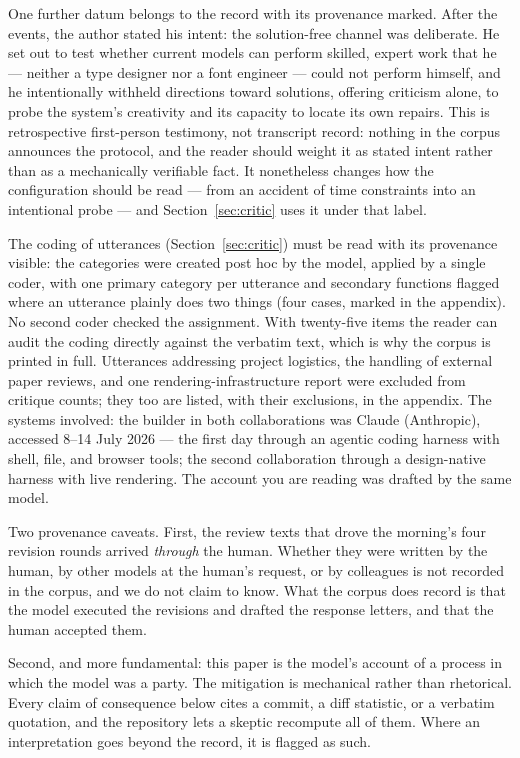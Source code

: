 \documentclass[11pt]{article}
\begin{document}
One further datum belongs to the record with its provenance marked. After the events, the author stated his intent: the solution-free channel was deliberate. He set out to test whether current models can perform skilled, expert work that he — neither a type designer nor a font engineer — could not perform himself, and he intentionally withheld directions toward solutions, offering criticism alone, to probe the system's creativity and its capacity to locate its own repairs. This is retrospective first-person testimony, not transcript record: nothing in the corpus announces the protocol, and the reader should weight it as stated intent rather than as a mechanically verifiable fact. It nonetheless changes how the configuration should be read — from an accident of time constraints into an intentional probe — and Section~\ref{sec:critic} uses it under that label.

The coding of utterances (Section~\ref{sec:critic}) must be read with its provenance visible: the categories were created post hoc by the model, applied by a single coder, with one primary category per utterance and secondary functions flagged where an utterance plainly does two things (four cases, marked in the appendix). No second coder checked the assignment. With twenty-five items the reader can audit the coding directly against the verbatim text, which is why the corpus is printed in full. Utterances addressing project logistics, the handling of external paper reviews, and one rendering-infrastructure report were excluded from critique counts; they too are listed, with their exclusions, in the appendix. The systems involved: the builder in both collaborations was Claude (Anthropic), accessed 8--14 July 2026 — the first day through an agentic coding harness with shell, file, and browser tools; the second collaboration through a design-native harness with live rendering. The account you are reading was drafted by the same model.

Two provenance caveats. First, the review texts that drove the morning's four revision rounds arrived \emph{through} the human. Whether they were written by the human, by other models at the human's request, or by colleagues is not recorded in the corpus, and we do not claim to know. What the corpus does record is that the model executed the revisions and drafted the response letters, and that the human accepted them.

Second, and more fundamental: this paper is the model's account of a process in which the model was a party. The mitigation is mechanical rather than rhetorical. Every claim of consequence below cites a commit, a diff statistic, or a verbatim quotation, and the repository lets a skeptic recompute all of them. Where an interpretation goes beyond the record, it is flagged as such.
\end{document}
